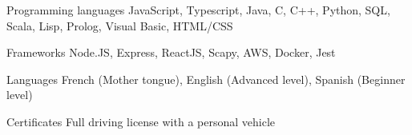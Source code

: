 
\begin{cvskills}
  \cvskill
    {Programming languages} %
    {JavaScript, Typescript, Java, C, C++, Python, SQL, Scala, Lisp, Prolog, Visual Basic, HTML/CSS} %

  \cvskill
    {Frameworks} %
    {Node.JS, Express, ReactJS, Scapy, AWS, Docker, Jest} %
    
  \cvskill
    {Languages} %
    {French (Mother tongue), English (Advanced level), Spanish (Beginner level)} %
    
  \cvskill
    {Certificates} %
    {Full driving license with a personal vehicle} %
\end{cvskills}
